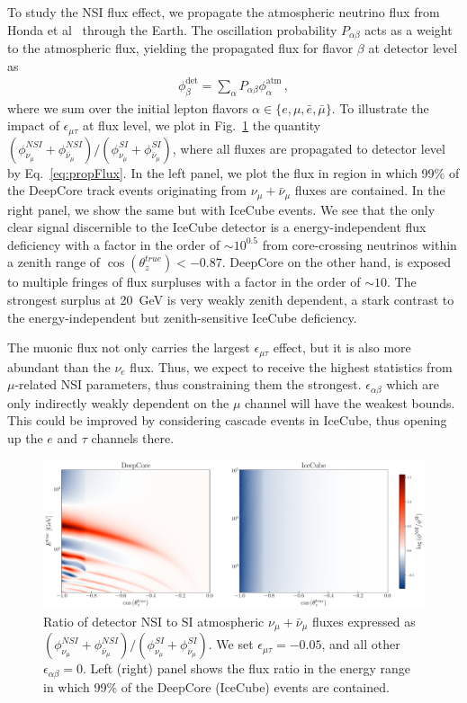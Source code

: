 \documentclass[draft=True]{revtex4-2}
\newcommand{\ztrue}{\ensuremath{\cos{(\theta_z^{true})}}}
\newcommand{\emt}{\ensuremath{\epsilon_{\mu\tau}}}
\renewcommand{\ne}{\nu_e}
\newcommand{\nm}{\nu_\mu}
\newcommand{\anm}{\bar\nu_\mu}
\begin{document}
To study the NSI flux effect, we propagate the atmospheric neutrino flux from Honda et al~\cite{hondapaper} through the Earth.
The oscillation probability $P_{\alpha \beta}$ acts as a weight to the atmospheric flux, yielding the propagated flux for flavor $\beta$ at detector level as 
\begin{align}\label{eq:propFlux}
    \phi_\beta^\text{det} = \sum_\alpha P_{\alpha\beta} \phi_\alpha^\text{atm} \,,
\end{align}
where we sum over the initial lepton flavors $\alpha \in \{e,\mu, \bar{e}, \bar{\mu}\}$. To illustrate the impact of $\emt$ at flux level, 
we plot in Fig.~\ref{fig:flux_ratio} the quantity $(\phi_{\nu_\mu}^{NSI} + \phi_{\bar\nu_\mu}^{NSI})/(\phi_{\nu_\mu}^{SI} + \phi_{\bar\nu_\mu}^{SI})$, 
where all fluxes are propagated to detector level by Eq.~\ref{eq:propFlux}. 
In the left panel, we plot the flux in region in which 99\% of the 
DeepCore track events originating from $\nm + \anm$ fluxes are contained. In the right panel, we show the same but with IceCube events. We see that the only clear signal discernible to the IceCube detector
is a energy-independent flux deficiency with a factor in the order of $\sim 10^{0.5}$ from core-crossing neutrinos within a zenith range of $\ztrue < -0.87$. DeepCore on the other hand, 
is exposed to multiple fringes of flux surpluses with a factor in the order of $\sim 10$. The strongest surplus at \SI{20}{\GeV} is very weakly zenith dependent, a stark contrast to the
energy-independent but zenith-sensitive IceCube deficiency.

The muonic flux not only carries the largest $\emt$ effect, but it is also more abundant than the $\ne$ flux. Thus, we expect to receive the highest statistics from $\mu$-related NSI parameters,
thus constraining them the strongest. $\epsilon_{\alpha\beta}$ which are only indirectly weakly dependent on the $\mu$ channel will have the weakest bounds. This could be improved
by considering cascade events in IceCube, thus opening up the $e$ and $\tau$ channels there.

\begin{figure}[!tb]
   \begin{center}
      \includegraphics[width=0.8\linewidth]{figures/flux_ratio.pdf}
   \end{center}
   \caption{Ratio of detector NSI to SI atmospheric $\nu_\mu + \bar{\nu}_\mu$ fluxes expressed as $(\phi_{\nu_\mu}^{NSI} + \phi_{\bar\nu_\mu}^{NSI})/(\phi_{\nu_\mu}^{SI} + \phi_{\bar\nu_\mu}^{SI})$.
   We set $\emt = -0.05$, and all other $\epsilon_{\alpha\beta}=0$. 
   Left (right) panel shows the flux ratio in the energy range in which 99\% of the DeepCore (IceCube) events are contained.
   }\label{fig:flux_ratio}
\end{figure}%
\end{document}
